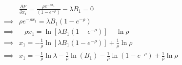 \begin{equation*}
\begin{split}
&\frac{\partial F}{\partial x_1} = \frac{\rho e^{-\rho
x_1}}{(1-e^{-\rho})} - \lambda B_1 = 0\\
\implies &\rho e^{-\rho x_1} =\lambda B_1(1-e^{-\rho})\\
\implies &-\rho x_1 = \ln \left[\lambda B_1(1-e^{-\rho}) \right] -
\ln \rho \\
\implies &x_1 = -\frac{1}{\rho} \ln \left[
\lambda B_1(1-e^{-\rho})\right] + \frac{1}{\rho} \ln \rho \\
\implies &x_1 = -\frac{1}{\rho}\ln \lambda - \frac{1}{\rho} \ln
(B_1) - \frac{1}{\rho}\ln (1-e^{-\rho}) + \frac{1}{\rho} \ln
\rho
\end{split}
\end{equation*}

